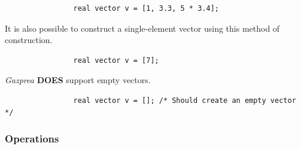 \documentclass{article}
\begin{document}
			\begin{lstlisting}
				real vector v = [1, 3.3, 5 * 3.4];
			\end{lstlisting}

			It is also possible to construct a single-element vector using this method of construction.

			\begin{lstlisting}
				real vector v = [7];
			\end{lstlisting}

			\textit{Gazprea} \textbf{DOES} support empty vectors.

			\begin{lstlisting}
				real vector v = []; /* Should create an empty vector */
			\end{lstlisting}

		\subsubsection{Operations}
\end{document}
